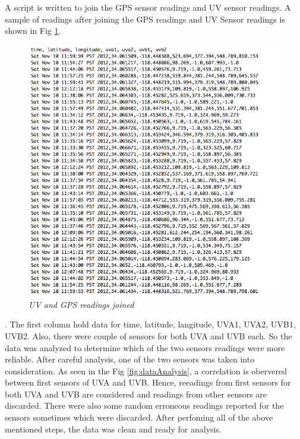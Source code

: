 \documentclass[12pt,fullpage,doublespace]{article}
\begin{document}
A script is written to join the GPS sensor readings and UV sensor readings. A sample of readings after joining the GPS readings and UV Sensor readings is shown in Fig \ref{fig:joinedReadings}.\begin{figure}
\begin{center}
\includegraphics[scale=0.45]{joinedReadings.png}
\caption{\small \sl UV and GPS readings joined\label{fig:joinedReadings}}
\end{center}
\end{figure}. The first column hold data for time, latitude, langitude, UVA1, UVA2, UVB1, UVB2. Also, there were couple of sensors for both UVA and UVB each. So the data was analyzed to determine which of the two sensors readings were more reliable. After careful analysis, one of the two sensors was taken into consideration. As seen in the Fig \ref{fig:dataAnalysis}, a correlation is obervered between first sensors of UVA and UVB. Hence, reeadings from first sensors for both UVA and UVB are considered and readings from other sensors are discarded. There were also some random erroneous readings reported for the sensors sometimes which were discarded. After perfoming all of the above mentioned steps, the data was clean and ready for analysis.
\end{document}
